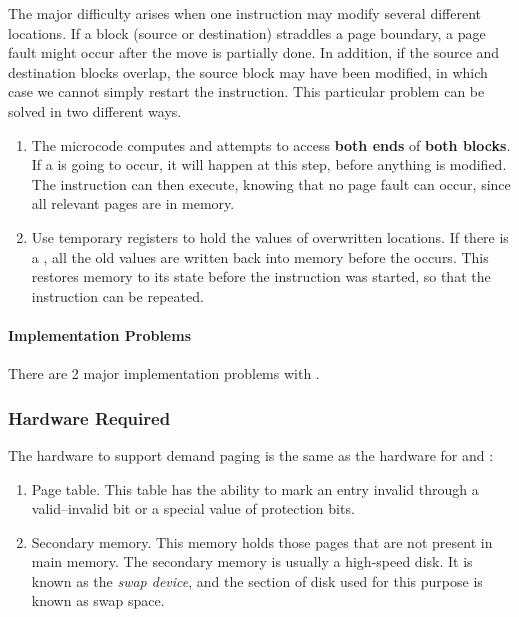 The major difficulty arises when one instruction may modify several different locations.
If a block (source or destination) straddles a page boundary, a page fault might occur after the move is partially done.
In addition, if the source and destination blocks overlap, the source block may have been modified, in which case we cannot simply restart the instruction.
This particular problem can be solved in two different ways.
\begin{enumerate}[noitemsep]
\item The microcode computes and attempts to access \textbf{both ends} of \textbf{both blocks}.
  If a  is going to occur, it will happen at this step, before anything is modified.
  The instruction can then execute, knowing that no page fault can occur, since all relevant pages are in memory.
\item Use temporary registers to hold the values of overwritten locations.
  If there is a , all the old values are written back into memory before the  occurs.
  This restores memory to its state before the instruction was started, so that the instruction can be repeated.
\end{enumerate}

\paragraph{Implementation Problems}\label{par:Demand_Paging_Problems-Implementation}
There are 2 major implementation problems with .
\subsubsection{Hardware Required}\label{subsubsec:Demand_Paging_Required_Hardware}
The hardware to support demand paging is the same as the hardware for  and :
\begin{enumerate}[noitemsep]
\item Page table.
  This table has the ability to mark an entry invalid through a valid–invalid bit or a special value of protection bits.
\item Secondary memory.
  This memory holds those pages that are not present in main memory.
  The secondary memory is usually a high-speed disk.
  It is known as the \emph{swap device}, and the section of disk used for this purpose is known as swap space.
\end{enumerate}

